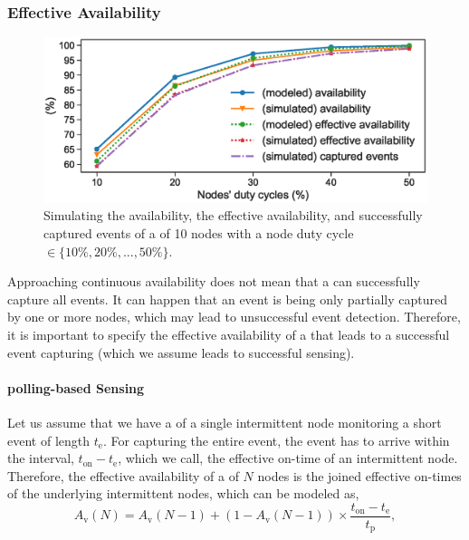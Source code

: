 \subsubsection{Effective Availability}
%
\begin{figure}
		\centering
		\includegraphics[width=\columnwidth]{figures/effective_availability_2}
		\caption{Simulating the availability, the effective availability, and successfully captured events of a \cis of 10 nodes with a node duty cycle $\in \{10\%, 20\%,...,50\%\}$.}
		\label{fig:cis_simulation}
\end{figure}
%
Approaching continuous availability does not mean that a \cis can successfully capture all events. It can happen that an event is being only partially captured by one or more nodes, which may lead to unsuccessful event detection. Therefore, it is important to specify the effective availability of a \cis that leads to a successful event capturing (which we assume leads to successful sensing). 

\paragraph{polling-based Sensing}
Let us assume that we have a \cis of a single intermittent node monitoring a short event of length $t_\text{e}$. For capturing the entire event, the event has to arrive within the interval, $t_\text{on} - t_\text{e}$, which we call, the effective on-time of an intermittent node.
Therefore, the effective availability of a \cis of $N$ nodes is the joined effective on-times of the underlying intermittent nodes, which can be modeled as,
%
\begin{equation}
		A_\text{v}(N) = A_\text{v}(N-1) + \left(1-A_\text{v}(N-1)\right) \times \frac{t_\text{on} - t_\text{e}}{t_\text{p}},
		\label{eq:cisSenseModel}
\end{equation} 
%

